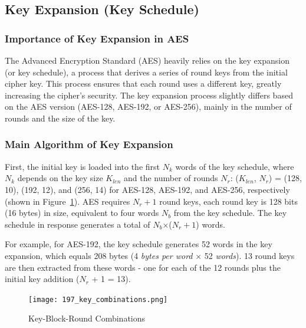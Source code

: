 \subsection{Key Expansion (Key Schedule)}

\subsubsection*{Importance of Key Expansion in AES} 

The Advanced Encryption Standard (AES) heavily relies on the key expansion (or key schedule), 
a process that derives a series of round keys from the initial cipher key. 
This process ensures that each round uses a different key, 
greatly increasing the cipher's security. The key expansion process slightly differs 
based on the AES version (AES-128, AES-192, or AES-256), mainly in the number of rounds 
and the size of the key.

\subsubsection*{Main Algorithm of Key Expansion}
\label{sec:key-expansion}

First, the initial key is loaded into the first $N_k$ words of the key schedule, where $N_k$ depends 
on the key size $K_{len}$ and the number of rounds $N_r$: ($K_{len}$, $N_r$) = (128, 10), (192, 12), and (256, 14) 
for AES-128, AES-192, and AES-256, respectively \cite{Key_Collisions} (shown in Figure~\ref{fig:key_comb}). AES requires $N_r+1$ round keys, each round key is 
128 bits (16 bytes) in size, equivalent to four words $N_b$ from the key schedule. The key schedule in 
response generates a total of $N_b$×($N_r+1$) words\cite{NIST_AES}. \newline

For example, for AES-192, the key schedule generates 52 words in the key expansion, which equals 208 bytes (4 \textit{bytes per word} × 52 \textit{words}).
13 round keys are then extracted from these words - one for each of the 12 rounds plus the initial key addition ($N_r$ + 1 = 13).

\begin{figure}[h] %
    \centering
    \texttt{[image: 197\_key\_combinations.png]} %
    \caption{
        Key-Block-Round Combinations \cite{NIST_AES}
    }
    \label{fig:key_comb} %
\end{figure}

